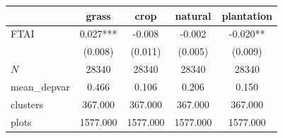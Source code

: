 {
\def\sym#1{\ifmmode^{#1}\else\(^{#1}\)\fi}
\begin{tabular}{l*{4}{c}}
\toprule
          &\multicolumn{1}{c}{grass}&\multicolumn{1}{c}{crop}&\multicolumn{1}{c}{natural}&\multicolumn{1}{c}{plantation}\\
\midrule
FTAI      &    0.027***&   -0.008   &   -0.002   &   -0.020** \\
          &  (0.008)   &  (0.011)   &  (0.005)   &  (0.009)   \\
\midrule
\(N\)     &    28340   &    28340   &    28340   &    28340   \\
mean\_depvar&    0.466   &    0.106   &    0.206   &    0.150   \\
clusters  &  367.000   &  367.000   &  367.000   &  367.000   \\
plots     & 1577.000   & 1577.000   & 1577.000   & 1577.000   \\
\bottomrule
\end{tabular}
}
